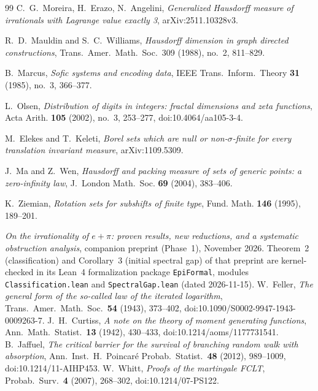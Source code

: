 \documentclass[11pt]{article}
\theoremstyle{definition}
\theoremstyle{remark}
\begin{document}
\begin{thebibliography}{99}
 C.~G.~Moreira, H.~Erazo, N.~Angelini,
\emph{Generalized Hausdorff measure of irrationals with Lagrange value exactly 3},
arXiv:2511.10328v3.

{\sloppy
{} R.~D.~Mauldin and S.~C.~Williams,
\emph{Hausdorff dimension in graph directed constructions},
Trans.~Amer.~Math.~Soc.~309 (1988), no.~2, 811--829.
}

 B.~Marcus, \emph{Sofic systems and encoding data},
IEEE Trans.~Inform.~Theory \textbf{31} (1985), no.~3, 366--377.

 L.~Olsen,
\emph{Distribution of digits in integers: fractal dimensions and zeta functions},
Acta Arith. \textbf{105} (2002), no.~3, 253--277,
doi:10.4064/\allowbreak aa105-3-4.

 M.~Elekes and T.~Keleti,
\emph{Borel sets which are null or non-$\sigma$-finite for every
translation invariant measure}, arXiv:1109.5309.


J.~Ma and Z.~Wen, \emph{Hausdorff and packing measure of sets of
generic points: a zero-infinity law}, J.~London Math.~Soc.
\textbf{69} (2004), 383--406.

K.~Ziemian, \emph{Rotation sets for subshifts of finite type},
Fund. Math. \textbf{146} (1995), 189--201.

 \emph{On the irrationality of $e+\pi$: proven results,
new reductions, and a systematic obstruction analysis},
companion preprint (Phase~1), November 2026. Theorem~2
(classification) and Corollary~3 (initial spectral gap) of that
preprint are kernel-checked in its Lean~4 formalization package
\texttt{EpiFormal}, modules \texttt{Classification.lean} and
\texttt{Spectral\allowbreak Gap.lean} (dated 2026-11-15).
W.~Feller, \emph{The general form of the so-called law of the iterated
logarithm}, Trans.\ Amer.\ Math.\ Soc.\ \textbf{54} (1943), 373--402,
doi:10.1090/S0002-9947-1943-0009263-7.
J.~H.~Curtiss, \emph{A note on the theory of moment generating
functions}, Ann.\ Math.\ Statist.\ \textbf{13} (1942), 430--433,
doi:10.1214/aoms/1177731541.
B.~Jaffuel, \emph{The critical barrier for the survival of branching
random walk with absorption}, Ann.\ Inst.\ H.\ Poincar\'e Probab.\
Statist.\ \textbf{48} (2012), 989--1009, doi:10.1214/11-AIHP453.
\bibitem{WhittFCLT}
W.~Whitt, \emph{Proofs of the martingale FCLT},
Probab.\ Surv.\ \textbf{4} (2007), 268--302,
doi:10.1214/07-PS122.
\end{thebibliography}
\end{document}
